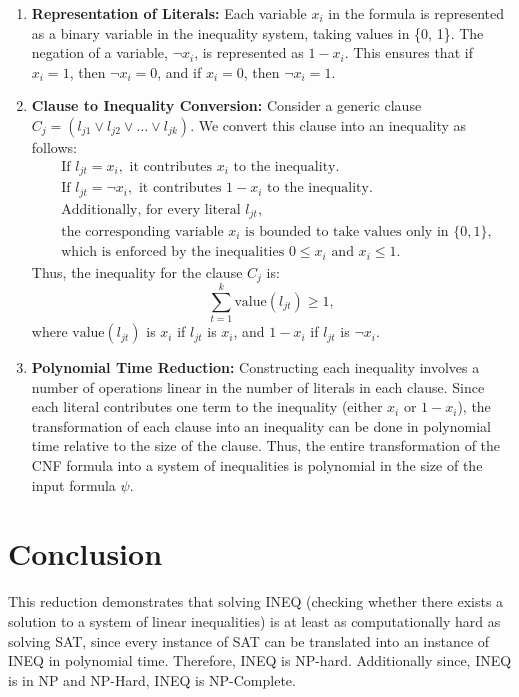 \documentclass{article}
\begin{document}
\begin{enumerate}
    \item \textbf{Representation of Literals:}
    Each variable $x_i$ in the formula is represented as a binary variable in the inequality system, taking values in \{0, 1\}. The negation of a variable, $\neg x_i$, is represented as $1 - x_i$. This ensures that if $x_i = 1$, then $\neg x_i = 0$, and if $x_i = 0$, then $\neg x_i = 1$.

    \item \textbf{Clause to Inequality Conversion:}
    Consider a generic clause $C_j = (l_{j1} \lor l_{j2} \lor \ldots \lor l_{jk})$. We convert this clause into an inequality as follows:
    \begin{align*}
        &\text{If } l_{jt} = x_i, \text{ it contributes } x_i \text{ to the inequality.} \\
        &\text{If } l_{jt} = \neg x_i, \text{ it contributes } 1 - x_i \text{ to the inequality.} \\
        &\text{Additionally, for every literal } l_{jt},\\
        &\text{the corresponding variable } x_i \text{ is bounded to take values only in } \{0, 1\},\\
        &\text{which is enforced by the inequalities } 0 \leq x_i \text{ and } x_i \leq 1.
    \end{align*}
    Thus, the inequality for the clause $C_j$ is:
    \[
    \sum_{t=1}^k \text{value}(l_{jt}) \geq 1,
    \]
    where $\text{value}(l_{jt})$ is $x_i$ if $l_{jt}$ is $x_i$, and $1 - x_i$ if $l_{jt}$ is $\neg x_i$.

    \item \textbf{Polynomial Time Reduction:}
    Constructing each inequality involves a number of operations linear in the number of literals in each clause. Since each literal contributes one term to the inequality (either $x_i$ or $1 - x_i$), the transformation of each clause into an inequality can be done in polynomial time relative to the size of the clause. Thus, the entire transformation of the CNF formula into a system of inequalities is polynomial in the size of the input formula $\psi$.
\end{enumerate}

\section*{Conclusion}

This reduction demonstrates that solving INEQ (checking whether there exists a solution to a system of linear inequalities) is at least as computationally hard as solving SAT, since every instance of SAT can be translated into an instance of INEQ in polynomial time. Therefore, INEQ is NP-hard. Additionally since, INEQ is in NP and NP-Hard, INEQ is NP-Complete.
\pagebreak
\end{document}
